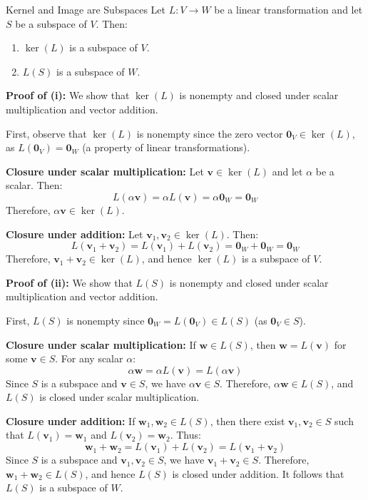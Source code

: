 \documentclass[12pt,a4paper]{article}
\newcommand{\vv}[1]{\mathbf{#1}}
\newcommand{\vzero}{\mathbf{0}}
\begin{document}
	\begin{theorem}{Kernel and Image are Subspaces}
		Let $L: V \to W$ be a linear transformation and let $S$ be a subspace of $V$. Then:
		\begin{enumerate}[label=(\roman*)]
			\item $\ker(L)$ is a subspace of $V$.
			\item $L(S)$ is a subspace of $W$.
		\end{enumerate}
	\end{theorem}
	
	\begin{proofbox}
		
		\textbf{Proof of (i):} We show that $\ker(L)$ is nonempty and closed under scalar multiplication and vector addition.
		
		First, observe that $\ker(L)$ is nonempty since the zero vector $\vzero_V \in \ker(L)$, as $L(\vzero_V) = \vzero_W$ (a property of linear transformations).
		
		\textbf{Closure under scalar multiplication:} Let $\vv{v} \in \ker(L)$ and let $\alpha$ be a scalar. Then:
		\[
		L(\alpha\vv{v}) = \alpha L(\vv{v}) = \alpha \vzero_W = \vzero_W
		\]
		Therefore, $\alpha\vv{v} \in \ker(L)$.
		
		\textbf{Closure under addition:} Let $\vv{v}_1, \vv{v}_2 \in \ker(L)$. Then:
		\[
		L(\vv{v}_1 + \vv{v}_2) = L(\vv{v}_1) + L(\vv{v}_2) = \vzero_W + \vzero_W = \vzero_W
		\]
		Therefore, $\vv{v}_1 + \vv{v}_2 \in \ker(L)$, and hence $\ker(L)$ is a subspace of $V$.
		
		\textbf{Proof of (ii):} We show that $L(S)$ is nonempty and closed under scalar multiplication and vector addition.
		
		First, $L(S)$ is nonempty since $\vzero_W = L(\vzero_V) \in L(S)$ (as $\vzero_V \in S$).
		
		\textbf{Closure under scalar multiplication:} If $\vv{w} \in L(S)$, then $\vv{w} = L(\vv{v})$ for some $\vv{v} \in S$. For any scalar $\alpha$:
		\[
		\alpha\vv{w} = \alpha L(\vv{v}) = L(\alpha\vv{v})
		\]
		Since $S$ is a subspace and $\vv{v} \in S$, we have $\alpha\vv{v} \in S$. Therefore, $\alpha\vv{w} \in L(S)$, and $L(S)$ is closed under scalar multiplication.
		
		\textbf{Closure under addition:} If $\vv{w}_1, \vv{w}_2 \in L(S)$, then there exist $\vv{v}_1, \vv{v}_2 \in S$ such that $L(\vv{v}_1) = \vv{w}_1$ and $L(\vv{v}_2) = \vv{w}_2$. Thus:
		\[
		\vv{w}_1 + \vv{w}_2 = L(\vv{v}_1) + L(\vv{v}_2) = L(\vv{v}_1 + \vv{v}_2)
		\]
		Since $S$ is a subspace and $\vv{v}_1, \vv{v}_2 \in S$, we have $\vv{v}_1 + \vv{v}_2 \in S$. Therefore, $\vv{w}_1 + \vv{w}_2 \in L(S)$, and hence $L(S)$ is closed under addition. It follows that $L(S)$ is a subspace of $W$.
		
	\end{proofbox}
	
\end{document}
